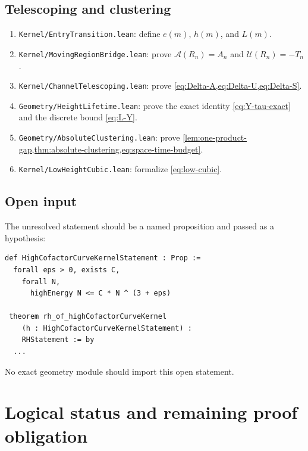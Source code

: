 \documentclass[11pt]{article}
\theoremstyle{definition}
\theoremstyle{remark}
\newcommand{\1}{\mathbf{1}}
\begin{document}
\subsection{Telescoping and clustering}

\begin{enumerate}[leftmargin=1.7em,itemsep=0.3em]
\item \texttt{Kernel/EntryTransition.lean}: define $e(m)$, $h(m)$, and $L(m)$.
\item \texttt{Kernel/MovingRegionBridge.lean}: prove $\mathcal A(R_n)=A_n$ and $\mathcal U(R_n)=-T_n$.
\item \texttt{Kernel/ChannelTelescoping.lean}: prove \cref{eq:Delta-A,eq:Delta-U,eq:Delta-S}.
\item \texttt{Geometry/HeightLifetime.lean}: prove the exact identity \cref{eq:Y-tau-exact} and the discrete bound \cref{eq:L-Y}.
\item \texttt{Geometry/AbsoluteClustering.lean}: prove \cref{lem:one-product-gap,thm:absolute-clustering,eq:space-time-budget}.
\item \texttt{Kernel/LowHeightCubic.lean}: formalize \cref{eq:low-cubic}.
\end{enumerate}

\subsection{Open input}

The unresolved statement should be a named proposition and passed as a hypothesis:
\begin{verbatim}
def HighCofactorCurveKernelStatement : Prop :=
  forall eps > 0, exists C,
    forall N,
      highEnergy N <= C * N ^ (3 + eps)

 theorem rh_of_highCofactorCurveKernel
    (h : HighCofactorCurveKernelStatement) :
    RHStatement := by
  ...
\end{verbatim}
No exact geometry module should import this open statement.

\section{Logical status and remaining proof obligation}
\label{sec:status}
\end{document}
